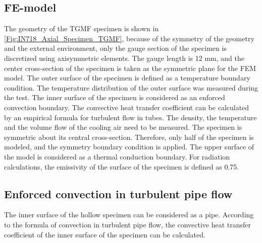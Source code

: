 \documentclass[preprint,5p,twocolumn,10pt,sort&compress]{elsarticle}
\begin{document}
\subsection{FE-model}

The geometry of the TGMF specimen is shown in \autoref{Fig:IN718_Axial_Specimen_TGMF}, because of the symmetry of the geometry and the external environment, only the gauge section of the specimen is discretized using axisymmetric elements. The gauge length is 12 mm, and the center cross-section of the specimen is taken as the symmetric plane for the FEM model. 
The outer surface of the specimen is defined as a temperature boundary condition. The temperature distribution of the outer surface was measured during the test. The inner surface of the specimen is considered as an enforced convection boundary. The convective heat transfer coefficient can be calculated by an empirical formula for turbulent flow in tubes. The density, the temperature and the volume flow of the cooling air need to be measured. The specimen is symmetric about its central cross-section. Therefore, only half of the specimen is modeled, and the symmetry boundary condition is applied. The upper surface of the model is considered as a thermal conduction boundary. For radiation calculations, the emissivity of the surface of the specimen is defined as 0.75.

\subsection{Enforced convection in turbulent pipe flow}
The inner surface of the hollow specimen can be considered as a pipe.
According to the formula of convection in turbulent pipe flow, the convective heat transfer coefficient of the inner surface of the specimen can be calculated.
\end{document}
